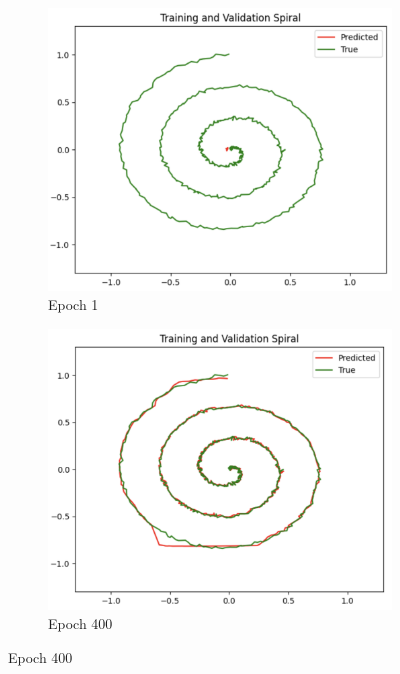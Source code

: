 \begin{figure}[H]
    \centering
    \begin{subfigure}[b]{0.45\linewidth}
        \includegraphics[width=\linewidth]{img/lnn_training_validation_spiral_epoch_1.png}
        \caption{Epoch 1}
        \label{fig:lnn_training_validation_spiral_epoch_1}
    \end{subfigure}
    \hfill
    \begin{subfigure}[b]{0.45\linewidth}
        \includegraphics[width=\linewidth]{img/lnn_training_validation_spiral_epoch_400.png}
        \caption{Epoch 400}

\end{subfigure}
\end{figure}
